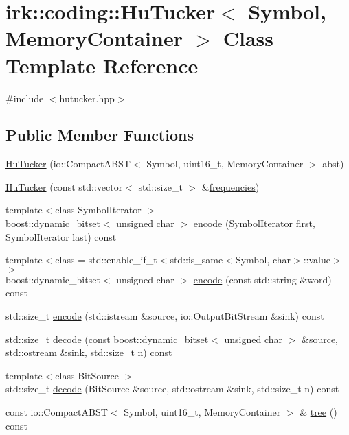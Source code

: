 \hypertarget{classirk_1_1coding_1_1HuTucker}{}\section{irk\+:\+:coding\+:\+:Hu\+Tucker$<$ Symbol, Memory\+Container $>$ Class Template Reference}
\label{classirk_1_1coding_1_1HuTucker}


{\ttfamily \#include $<$hutucker.\+hpp$>$}

\subsection*{Public Member Functions}
\begin{DoxyCompactItemize}
\item 
\mbox{\hyperlink{classirk_1_1coding_1_1HuTucker_adb12746133da5891e437ef4430caaf45}{Hu\+Tucker}} (io\+::\+Compact\+A\+B\+ST$<$ Symbol, uint16\+\_\+t, Memory\+Container $>$ abst)
\item 
\mbox{\hyperlink{classirk_1_1coding_1_1HuTucker_a037c234fff77b8a40494acbab9cd1475}{Hu\+Tucker}} (const std\+::vector$<$ std\+::size\+\_\+t $>$ \&\mbox{\hyperlink{irk-uncompress_8cpp_a2cd80733ced3d7eda8a6de0389cccc73}{frequencies}})
\item 
{\footnotesize template$<$class Symbol\+Iterator $>$ }\\boost\+::dynamic\+\_\+bitset$<$ unsigned char $>$ \mbox{\hyperlink{classirk_1_1coding_1_1HuTucker_a311952f32224b56268f7d9a76e9819ec}{encode}} (Symbol\+Iterator first, Symbol\+Iterator last) const
\item 
{\footnotesize template$<$class  = std\+::enable\+\_\+if\+\_\+t$<$std\+::is\+\_\+same$<$\+Symbol, char$>$\+::value$>$$>$ }\\boost\+::dynamic\+\_\+bitset$<$ unsigned char $>$ \mbox{\hyperlink{classirk_1_1coding_1_1HuTucker_ad3706b7ab4c8a440e21998f5996c38bb}{encode}} (const std\+::string \&word) const
\item 
std\+::size\+\_\+t \mbox{\hyperlink{classirk_1_1coding_1_1HuTucker_a68a281dc46a6038405fffeb8ea193a7e}{encode}} (std\+::istream \&source, io\+::\+Output\+Bit\+Stream \&sink) const
\item 
std\+::size\+\_\+t \mbox{\hyperlink{classirk_1_1coding_1_1HuTucker_aac96d2029fe7c11723546640c29417e0}{decode}} (const boost\+::dynamic\+\_\+bitset$<$ unsigned char $>$ \&source, std\+::ostream \&sink, std\+::size\+\_\+t n) const
\item 
{\footnotesize template$<$class Bit\+Source $>$ }\\std\+::size\+\_\+t \mbox{\hyperlink{classirk_1_1coding_1_1HuTucker_a9ca634cc3bbe50b061655db9546b35a3}{decode}} (Bit\+Source \&source, std\+::ostream \&sink, std\+::size\+\_\+t n) const
\item 
const io\+::\+Compact\+A\+B\+ST$<$ Symbol, uint16\+\_\+t, Memory\+Container $>$ \& \mbox{\hyperlink{classirk_1_1coding_1_1HuTucker_a4def39a1f10a3c7b5a9d87574bfef552}{tree}} () const
\end{DoxyCompactItemize}


